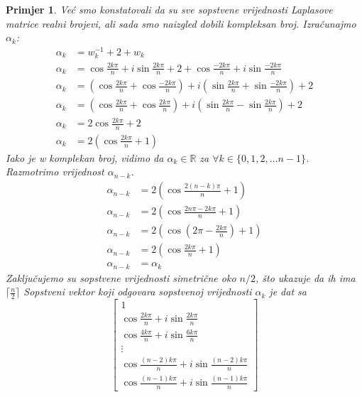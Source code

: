 \documentclass[11pt]{article}
\newtheorem{example}{Primjer}
\begin{document}
\begin{example}
	Već smo konstatovali da su sve sopstvene vrijednosti Laplasove matrice realni brojevi, ali sada smo naizgled dobili kompleksan broj. 
	Izračunajmo $\alpha_k$:
	\[
	\begin{split}
		\alpha_k & = w_k^{-1} + 2 + w_k \\
		\alpha_k & = \cos \frac{2 k \pi}{n} + i \sin \frac{2 k \pi}{n} + 2 + \cos \frac{-2 k \pi}{n} + i \sin \frac{-2 k \pi}{n} \\
		\alpha_k & = (\cos \frac{2 k \pi}{n} + \cos \frac{-2 k \pi}{n}) + i(\sin \frac{2 k \pi}{n} + \sin \frac{-2 k \pi}{n}) + 2 \\
		\alpha_k & = (\cos \frac{2 k \pi}{n} + \cos \frac{2 k \pi}{n}) + i(\sin \frac{2 k \pi}{n} - \sin \frac{2 k \pi}{n}) + 2 \\
		\alpha_k & = 2\cos \frac{2 k \pi}{n} + 2 \\
		\alpha_k & = 2 (\cos \frac{2 k \pi}{n} + 1)
	\end{split}
	\]
	Iako je w komplekan broj, vidimo da $\alpha_k \in \mathbb{R}$ za $\forall k \in \{0,1,2, \dots n-1\}$.
	Razmotrimo vrijednost $\alpha_{n-k}$.
	\[
	\begin{split}
		\alpha_{n-k} & = 2 (\cos \frac{2 (n-k) \pi}{n} + 1) \\
		\alpha_{n-k} & = 2 (\cos \frac{2n\pi - 2k\pi}{n} + 1) \\
		\alpha_{n-k} & = 2 (\cos ( 2\pi - \frac{2k\pi}{n}) + 1) \\
		\alpha_{n-k} & = 2 (\cos \frac{2k\pi}{n} + 1) \\ 
		\alpha_{n-k} & = \alpha_k 
	\end{split}
	\]
	Zaključujemo su sopstvene vrijednosti simetrične oko $n/2$, što ukazuje da ih ima $\lceil \frac{n}{2}\rceil$ 
	Sopstveni vektor koji odgovara sopstvenoj vrijednosti $\alpha_k$ je dat sa 
	\[
	\begin{bmatrix}
	1 \\
	\cos \frac{2 k \pi}{n} + i \sin \frac{2 k \pi}{n} \\
	\cos \frac{4 k \pi}{n} + i \sin \frac{6 k \pi}{n} \\
	\vdots \\
	\cos \frac{(n-2) k \pi}{n} + i \sin \frac{(n-2) k \pi}{n} \\
	\cos \frac{(n-1) k \pi}{n} + i \sin \frac{(n-1) k \pi}{n} 
	\end{bmatrix}
	\]
	\newpage
	\end{example}
\end{document}
